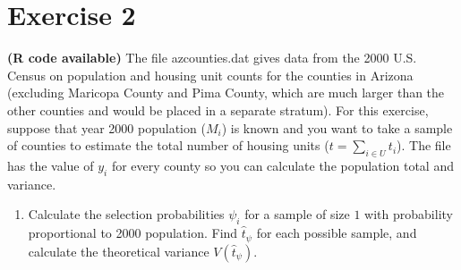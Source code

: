 \documentclass[12pt]{article}
\begin{document}
\section*{Exercise 2}
\textbf{\color{ForestGreen}(R code available)} The file azcounties.dat gives data from the 2000 U.S. Census on population and housing unit counts for the counties in Arizona (excluding Maricopa County and
Pima County, which are much larger than the other counties and would be placed in a separate stratum). For this exercise, suppose that year 2000 population ($M_i$) is known and you want to take a sample of counties to estimate the total number of housing units ($t =\sum_{i \in U} t_i$). The file has the value of $y_i$ for every county so you can calculate the population total and variance.
\begin{enumerate}
\item Calculate the selection probabilities $\psi_i$ for a sample of size $1$ with probability
proportional to 2000 population. Find $\hat{t}_\psi$ for each possible sample, and calculate
the theoretical variance $V(\hat{t}_\psi)$.\\
\end{enumerate}
\end{document}

